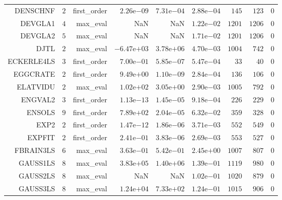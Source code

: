 \begin{longtable}{rrrrrrrrr}
DENSCHNF & \(     2\) & first\_order & \( 2.26\)e\(-09\) & \( 7.31\)e\(-04\) & \( 2.88\)e\(-04\) & \(   145\) & \(   123\) & \(     0\) \\
DEVGLA1 & \(     4\) & max\_eval &       NaN &       NaN & \( 1.22\)e\(-02\) & \(  1201\) & \(  1206\) & \(     0\) \\
DEVGLA2 & \(     5\) & max\_eval &       NaN &       NaN & \( 1.71\)e\(-02\) & \(  1201\) & \(  1206\) & \(     0\) \\
DJTL & \(     2\) & max\_eval & \(-6.47\)e\(+03\) & \( 3.78\)e\(+06\) & \( 4.70\)e\(-03\) & \(  1004\) & \(   742\) & \(     0\) \\
ECKERLE4LS & \(     3\) & first\_order & \( 7.00\)e\(-01\) & \( 5.85\)e\(-07\) & \( 5.47\)e\(-04\) & \(    33\) & \(    40\) & \(     0\) \\
EGGCRATE & \(     2\) & first\_order & \( 9.49\)e\(+00\) & \( 1.10\)e\(-09\) & \( 2.84\)e\(-04\) & \(   136\) & \(   106\) & \(     0\) \\
ELATVIDU & \(     2\) & max\_eval & \( 1.02\)e\(+02\) & \( 3.05\)e\(+00\) & \( 2.90\)e\(-03\) & \(  1005\) & \(   792\) & \(     0\) \\
ENGVAL2 & \(     3\) & first\_order & \( 1.13\)e\(-13\) & \( 1.45\)e\(-05\) & \( 9.18\)e\(-04\) & \(   226\) & \(   229\) & \(     0\) \\
ENSOLS & \(     9\) & first\_order & \( 7.89\)e\(+02\) & \( 2.04\)e\(-05\) & \( 6.32\)e\(-02\) & \(   359\) & \(   328\) & \(     0\) \\
EXP2 & \(     2\) & first\_order & \( 1.47\)e\(-12\) & \( 1.86\)e\(-06\) & \( 3.71\)e\(-03\) & \(   552\) & \(   549\) & \(     0\) \\
EXPFIT & \(     2\) & first\_order & \( 2.41\)e\(-01\) & \( 3.83\)e\(-06\) & \( 2.69\)e\(-03\) & \(   553\) & \(   527\) & \(     0\) \\
FBRAIN3LS & \(     6\) & max\_eval & \( 3.63\)e\(-01\) & \( 5.42\)e\(-01\) & \( 2.45\)e\(+00\) & \(  1007\) & \(   807\) & \(     0\) \\
GAUSS1LS & \(     8\) & max\_eval & \( 3.83\)e\(+05\) & \( 1.40\)e\(+06\) & \( 1.39\)e\(-01\) & \(  1119\) & \(   980\) & \(     0\) \\
GAUSS2LS & \(     8\) & max\_eval &       NaN &       NaN & \( 1.02\)e\(-01\) & \(  1020\) & \(   879\) & \(     0\) \\
GAUSS3LS & \(     8\) & max\_eval & \( 1.24\)e\(+04\) & \( 7.33\)e\(+02\) & \( 1.24\)e\(-01\) & \(  1015\) & \(   906\) & \(     0\) \\

\end{longtable}
